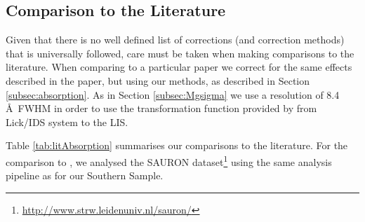 \documentclass[a4paper,fleqn,usenatbib]{mnras}
\begin{document}
	\subsection{Comparison to the Literature}
		\label{subsec:Lit}
		Given that there is no well defined list of corrections (and correction methods) that is universally followed, care must be taken when making comparisons to the literature. When comparing to a particular paper we correct for the same effects described in the paper, but using our methods, as described in Section \ref{subsec:absorption}. As in Section \ref{subsec:Mgsigma} we use a resolution of 8.4\,\AA\ FWHM in order to use the transformation function provided by \citet{Vazdekis2010} from Lick/IDS system to the LIS.

		Table \ref{tab:litAbsorption} summarises our comparisons to the literature. For the comparison to \citet{Vazdekis2010}, we analysed the SAURON dataset\footnote{\url{http://www.strw.leidenuniv.nl/sauron/}} \citep{Emsellem2004} using the same analysis pipeline as for our Southern Sample. 
\end{document}
